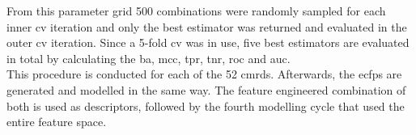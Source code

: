 From this parameter grid \num{500} combinations were randomly sampled for each inner \ac{cv} iteration and only the best estimator was returned and evaluated in the outer \ac{cv} iteration. Since a \num{5}-fold \ac{cv} was in use, five best estimators are evaluated in total by calculating the \ac{ba}, \ac{mcc}, \ac{tpr}, \ac{tnr}, \ac{roc} and \ac{auc}.\\
This procedure is conducted for each of the \num{52} \acl{cmrds}. Afterwards, the \acp{ecfp} are generated and modelled in the same way. The feature engineered combination of both is used as descriptors, followed by the fourth modelling cycle that used the entire feature space. 